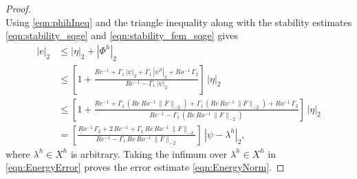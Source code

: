 \begin{proof}
\begin{equation}
    \label{eqn:phihIneq}
  \end{equation}
  Using \eqref{eqn:phihIneq} and the triangle inequality along with the
  stability estimates \eqref{eqn:stability_sqge} and
  \eqref{eqn:stability_fem_sqge} gives
  \begin{align}
    |e|_2 &\le |\eta|_2 + |\Phi^h|_2 \nonumber \\[0.2cm]
    &\le \left[ 1 + \frac{Re^{-1} + \Gamma_1 \, |\psi|_2 + \Gamma_1 \,
      |\psi^h|_2 + Ro^{-1}\, \Gamma_2} {Re^{-1} - \Gamma_1 \, |\psi|_2} \right] \, |\eta|_2
      \nonumber \\[0.2cm]
    &\le \left[ 1 + \frac{Re^{-1} + \Gamma_1 \, \left( Re \, Ro^{-1} \, \| F
      \|_{-2} \right) + \Gamma_1 \, \left( Re \, Ro^{-1} \, \| F \|_{-2} \right)
      + Ro^{-1}\, \Gamma_2} {Re^{-1} - \Gamma_1 \, \left( Re \, Ro^{-1} \, \| F \|_{-2}
      \right) } \right] \, |\eta|_2 \nonumber \\
    &= \left[ \frac{ Ro^{-1}\, \Gamma_2 + 2 \, Re^{-1} + \Gamma_1 \, Re \, Ro^{-1} \,
      \| F \|_{-2} } { Re^{-1} - \Gamma_1 \, Re \, Ro^{-1} \, \| F \|_{-2} }
        \right] \, | \psi-\lambda^h |_2 ,
    \label{eqn:EnergyError}
  \end{align}
  where $\lambda^h \in X^h$ is arbitrary.  Taking the infimum over $\lambda^h \in
  X^h$ in \eqref{eqn:EnergyError} proves the error estimate
  \eqref{eqn:EnergyNorm}.
\end{proof}

